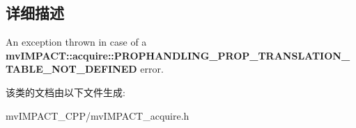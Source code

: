 \subsection{详细描述}
An exception thrown in case of a {\bfseries mv\+I\+M\+P\+A\+C\+T\+::acquire\+::\+P\+R\+O\+P\+H\+A\+N\+D\+L\+I\+N\+G\+\_\+\+P\+R\+O\+P\+\_\+\+T\+R\+A\+N\+S\+L\+A\+T\+I\+O\+N\+\_\+\+T\+A\+B\+L\+E\+\_\+\+N\+O\+T\+\_\+\+D\+E\+F\+I\+N\+E\+D} error. 

该类的文档由以下文件生成\+:\begin{DoxyCompactItemize}
\item 
mv\+I\+M\+P\+A\+C\+T\+\_\+\+C\+P\+P/mv\+I\+M\+P\+A\+C\+T\+\_\+acquire.\+h\end{DoxyCompactItemize}
